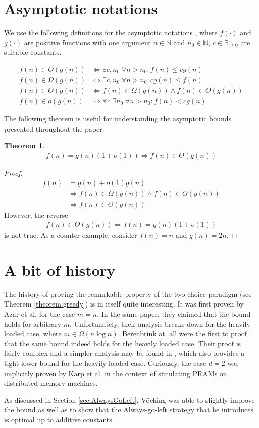 \documentclass[a4paper,12pt]{article}
\newtheorem{theorem}{Theorem}
\begin{document}
\section{Asymptotic notations}
\label{sec:asymptotic}
We use the following definitions for the asymptotic notations \cite{CLRS01}, where $f(\cdot)$ and $g(\cdot)$ are positive functions with one argument $n\in \mathbb{N}$ and $n_0 \in \mathbb{N}$, $c \in \mathbb{R}_{\geq 0}$ are suitable constants.

\begin{align*}
f(n) \in O(g(n)) &\Leftrightarrow \exists c, n_0 \;\forall n> n_0: f(n)\leq c  g(n) \\
f(n) \in \Omega(g(n)) &\Leftrightarrow \exists c, n_0\;\forall n> n_0: cg(n) \leq f(n) \\
f(n) \in \Theta(g(n)) &\Leftrightarrow f(n) \in \Omega(g(n)) \land f(n)\in O(g(n)) \\
f(n) \in o(g(n)) &\Leftrightarrow \forall c \; \exists n_0\;\forall n> n_0: f(n) < cg(n)
\end{align*}

The following theorem is useful for understanding the asymptotic bounds presented throughout the paper.
\begin{theorem}\label{theorem:asymptotic}
\begin{align*}
f(n) = g(n)  (1+o(1)) \Rightarrow f(n) \in \Theta(g(n)) 
\end{align*}
\end{theorem}
\begin{proof}
\begin{align*}
f(n) &= g(n)+o(1) g(n) \\
&\Rightarrow f(n) \in \Omega(g(n)) \land f(n) \in O(g(n)) \\
&\Rightarrow f(n) \in \Theta(g(n))
\end{align*}
However, the reverse
\begin{align*}
f(n) \in \Theta(g(n)) \Rightarrow f(n) = g(n)  (1+o(1)) 
\end{align*}
is not true. As a counter example, consider $f(n) = n$ and $g(n) = 2n$.
\end{proof}

\section{A bit of history}
\label{sec:historyOfGreedy}
The history of proving the remarkable property of the two-choice paradigm (see Theorem \ref{theorem:greedy}) is in itself quite interesting. It was first proven by Azar et al. \cite{ABKU99} for the case $m = n$. In the same paper, they claimed that the bound holds for arbitrary $m$. Unfortunately, their analysis breaks down for the heavily loaded case, where $m \in \Omega\left(n  \log n\right)$. Berenbrink at. all \cite{BFZR08} were the first to proof that the same bound indeed holds for the heavily loaded case. Their proof is fairly complex and a simpler analysis may be found in \cite{TW13}, which also provides a tight lower bound for the heavily loaded case. Curiously, the case $d = 2$ was implicitly proven by Karp et al. in the context of simulating PRAMs on distributed memory machines\cite{KLM92}.

As discussed in Section \ref{sec:AlwaysGoLeft}, V\"ocking \cite{VOC03} was able to slightly improve the bound as well as to show that the Always-go-left strategy that he introduces is optimal up to additive constants.



 
\end{document}
